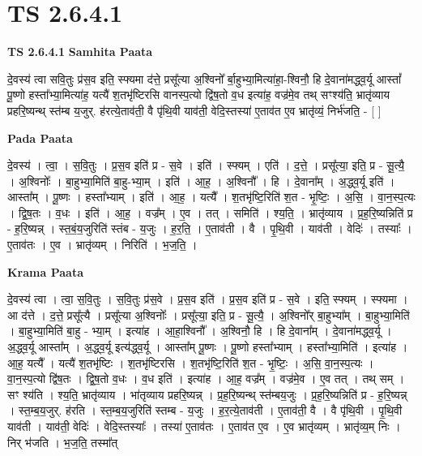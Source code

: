 \documentclass[17pt]{extarticle}
\begin{document}
\section*{ TS 2.6.4.1 }

\textbf{TS 2.6.4.1 } \newline
\textbf{Samhita Paata} \newline

दे॒वस्य॑ त्वा सवि॒तुः प्र॑स॒व इति॒ स्फ्यमा द॑त्ते॒ प्रसू᳚त्या अ॒श्विनो᳚ र्बा॒हुभ्या॒मित्या॑हा॒-श्विनौ॒ हि दे॒वाना॑मद्ध्व॒र्यू आस्तां᳚ पू॒ष्णो हस्ता᳚भ्या॒मित्या॑ह॒ यत्यै॑ श॒तभृ॑ष्टिरसि वानस्प॒त्यो द्वि॑ष॒तो व॒ध इत्या॑ह॒ वज्र॑मे॒व तथ् सꣳश्य॑ति॒ भ्रातृ॑व्याय प्रहरि॒ष्यन्थ् स्त॑म्ब य॒जुर्. ह॑रत्ये॒ताव॑ती॒ वै पृ॑थि॒वी याव॑ती॒ वेदि॒स्तस्या॑ ए॒ताव॑त ए॒व भ्रातृ॑व्यं॒ निर्भ॑जति॒ - [  ] \newline

\textbf{Pada Paata} \newline

दे॒वस्य॑ । त्वा॒ । स॒वि॒तुः । प्र॒स॒व इति॑ प्र - स॒वे । इति॑ । स्फ्यम् । एति॑ । द॒त्ते॒ । प्रसू᳚त्या॒ इति॒ प्र - सू॒त्यै॒ । अ॒श्विनोः᳚ । बा॒हुभ्या॒मिति॑ बा॒हु-भ्या॒म् । इति॑ । आ॒ह॒ । अ॒श्विनौ᳚ । हि । दे॒वाना᳚म् । अ॒द्ध्व॒र्यू इति॑ । आस्ता᳚म् । पू॒ष्णः । हस्ता᳚भ्याम् । इति॑ । आ॒ह॒ । यत्यै᳚ । श॒तभृ॑ष्टि॒रिति॑ श॒त - भृ॒ष्टिः॒ । अ॒सि॒ । वा॒न॒स्प॒त्यः । द्वि॒ष॒तः । व॒धः । इति॑ । आ॒ह॒ । वज्र᳚म् । ए॒व । तत् । समिति॑ । श्य॒ति॒ । भ्रातृ॑व्याय । प्र॒ह॒रि॒ष्यन्निति॑ प्र - ह॒रि॒ष्यन्न् । स्त॒बं॒य॒जुरिति॑ स्तंब - य॒जुः । ह॒र॒ति॒ । ए॒ताव॑ती । वै । पृ॒थि॒वी । याव॑ती । वेदिः॑ । तस्याः᳚ । ए॒ताव॑तः । ए॒व । भ्रातृ॑व्यम् । निरिति॑ । भ॒ज॒ति॒ ।  \newline


\textbf{Krama Paata} \newline

दे॒वस्य॑ त्वा । त्वा॒ स॒वि॒तुः । स॒वि॒तुः प्र॑स॒वे । प्र॒स॒व इति॑ । प्र॒स॒व इति॑ प्र - स॒वे । इति॒ स्फ्यम् । स्फ्यमा । आ द॑त्ते । द॒त्ते॒ प्रसू᳚त्यै । प्रसू᳚त्या अ॒श्विनोः᳚ । प्रसू᳚त्या॒ इति॒ प्र - सू॒त्यै॒ । अ॒श्विनो᳚र् बा॒हुभ्या᳚म् । बा॒हुभ्या॒मिति॑ । बा॒हुभ्या॒मिति॑ बा॒हु - भ्या॒म् । इत्या॑ह । आ॒हा॒श्विनौ᳚ । अ॒श्विनौ॒ हि । हि दे॒वाना᳚म् । दे॒वाना॑मद्ध्व॒र्यू । अ॒द्ध्व॒र्यू आस्ता᳚म् । अ॒द्ध्व॒र्यू इत्य॑द्ध्व॒र्यू । आस्ता᳚म् पू॒ष्णः । पू॒ष्णो हस्ता᳚भ्याम् । हस्ता᳚भ्या॒मिति॑ । इत्या॑ह । आ॒ह॒ यत्यै᳚ । यत्यै॑ श॒तभृ॑ष्टिः । श॒तभृ॑ष्टिरसि । श॒तभृ॑ष्टि॒रिति॑ श॒त - भृ॒ष्टिः॒ । अ॒सि॒ वा॒न॒स्प॒त्यः । वा॒न॒स्प॒त्यो द्वि॑ष॒तः । द्वि॒ष॒तो व॒धः । व॒ध इति॑ । इत्या॑ह । आ॒ह॒ वज्र᳚म् । वज्र॑मे॒व । ए॒व तत् । तथ् सम् । सꣳ श्य॑ति । श्य॒ति॒ भ्रातृ॑व्याय । भा॑तृव्याय प्रहरि॒ष्यन्न् । प्र॒ह॒रि॒ष्यन्थ् स्त॑म्बय॒जुः । प्र॒ह॒रि॒ष्यन्निति॑ प्र - ह॒रि॒ष्यन्न् । स्त॒म्ब॒य॒जुर्. ह॑रति । स्त॒म्ब॒य॒जुरिति॑ स्तम्ब - य॒जुः । ह॒र॒त्ये॒ताव॑ती । ए॒ताव॑ती॒ वै । वै पृ॑थि॒वी । पृ॒थि॒वी याव॑ती । याव॑ती॒ वेदिः॑ । वेदि॒स्तस्याः᳚ । तस्या॑ ए॒ताव॑तः । ए॒ताव॑त ए॒व । ए॒व भ्रातृ॑व्यम् । भ्रातृ॑व्य॒म् निः । निर् भ॑जति । भ॒ज॒ति॒ तस्मा᳚त् \newline
\end{document}
